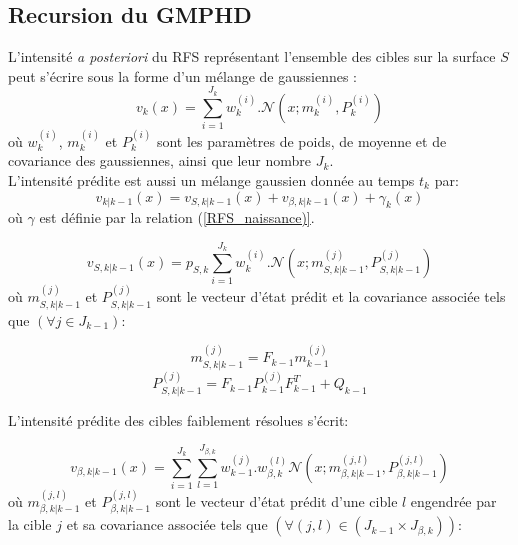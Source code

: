 \documentclass[10pt,french,a4paper]{report}
\begin{document}
\subsection{Recursion du GMPHD}
L'intensité \textit{a posteriori} du \ac{RFS} représentant l'ensemble des cibles sur la surface $S$ peut s'écrire sous la forme d'un mélange de gaussiennes :
\begin{equation}
\label{gauss}
 v_k(x)=\sum\limits_{i=1}^{J_{k}}w_{k}^{(i)}.\mathcal{N}\left(x;m_{k}^{(i)},P_{k}^{(i)} \right) 
\end{equation}
où $w_{k}^{(i)}$, $m_{k}^{(i)}$ et $P_{k}^{(i)}$ sont les paramètres de poids, de moyenne et de covariance des gaussiennes, ainsi que leur nombre $J_{k}$.\\

L'intensité prédite est aussi un mélange gaussien donnée au temps $t_k$ par:
\begin{equation}
\label{gauss_pred}
 v_{k|k-1}(x)=  v_{S,k|k-1}(x)+ v_{\beta,k|k-1}(x)+ \gamma_{k}(x)
\end{equation}
où $\gamma$ est définie par la relation (\ref{RFS_naissance)}.

\begin{equation}
\label{gauss_surv}
v_{S,k|k-1}(x)=  p_{S,k} \sum\limits_{i=1}^{J_{k}}w_{k}^{(i)}.\mathcal{N}\left(x;m_{S,k|k-1}^{(j)},P_{S,k|k-1}^{(j)} \right) 
\end{equation}
où $m_{S,k|k-1}^{(j)}$ et $P_{S,k|k-1}^{(j)}$ sont le vecteur d'état prédit et la covariance associée tels que $(\forall j \in J_{k-1})$:

\begin{equation}
m_{S,k|k-1}^{(j)}= F_{k-1} m_{k-1}^{(j)}
\end{equation}
\begin{equation}
P_{S,k|k-1}^{(j)}=F_{k-1}  P_{k-1}^{(j)}  F_{k-1}^T + Q_{k-1}
\end{equation}

L'intensité prédite des cibles faiblement résolues s'écrit:

\begin{equation}
\label{gauss_eng}
v_{\beta,k|k-1}(x)=  \sum\limits_{i=1}^{J_{k}}  \sum\limits_{l=1}^{J_{\beta, k}} w_{k-1}^{(j)}. w_{\beta, k}^{(l)} \mathcal{N}\left(x;m_{\beta ,k|k-1}^{(j,l)},P_{\beta, k|k-1}^{(j,l)} \right) 
\end{equation}
où $m_{\beta,k|k-1}^{(j,l)}$ et $P_{\beta,k|k-1}^{(j,l)}$ sont le vecteur d'état prédit d'une cible $l$ engendrée par la cible $j$ et sa covariance associée tels que $(\forall (j,l) \in (J_{k-1}\times J_{\beta, k}))$:
\end{document}
